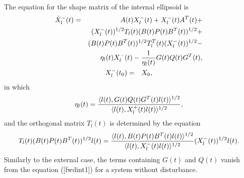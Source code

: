 \documentclass[letterpaper,10pt,english]{sphinxmanual}
\begin{document}
The equation for the shape matrix of the internal ellipsoid is
\label{chap_reach:equation-fwdint1}\begin{gather}
\begin{split}\dot{X}^-_l(t) & = & A(t)X^-_l(t) + X^-_l(t)A^T(t) +\nonumber \\
& & (X_l^{-}(t))^{1/2}T_l(t)(B(t)P(t)B^T(t))^{1/2} +\nonumber \\
& & (B(t)P(t)B^T(t))^{1/2}T_l^T(t)(X_l^{-}(t))^{1/2} -\nonumber \\
& & \eta_l(t)X^-_l(t) - \frac{1}{\eta_l(t)}G(t)Q(t)G^T(t), \\\end{split}\label{chap_reach-fwdint1}\\\begin{split}X^-_l(t_0) & = & X_0, \label{fwdint2}\end{split}\notag
\end{gather}
in which
\begin{gather}
\begin{split}\eta_l(t) = \frac{\langle l(t),
G(t)Q(t)G^T(t)l(t)\rangle^{1/2}}{\langle l(t), X^+_l(t)l(t)\rangle^{1/2}},\end{split}\notag
\end{gather}
and the orthogonal matrix $T_l(t)$ is determined by the equation
\begin{gather}
\begin{split}T_l(t)(B(t)P(t)B^T(t))^{1/2}l(t) = \frac{\langle l(t),
B(t)P(t)B^T(t)l(t)\rangle^{1/2}}{\langle l(t),
X_l^-(t)l(t)\rangle^{1/2}}(X_l^{-}(t))^{1/2}l(t).\end{split}\notag
\end{gather}
Similarly to the external case, the terms containing $G(t)$ and
$Q(t)$ vanish from the equation ({[}fwdint1{]}) for a system without
disturbance.
\end{document}
